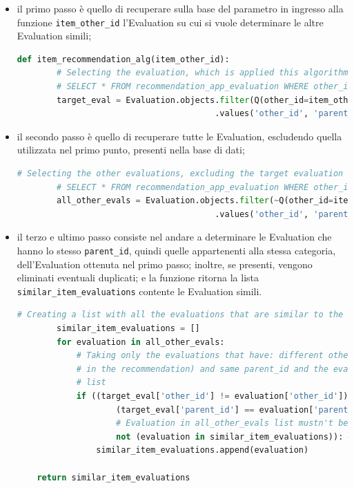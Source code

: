 \begin{itemize}
    \item il primo passo è quello di recuperare sulla base del parametro in ingresso alla funzione \texttt{item\_other\_id} 
    l'Evaluation su cui si vuole determinare le altre Evaluation simili;
    \begin{lstlisting}[language=Python, label=lst:IB_CF_Evaluation_1]
    def item_recommendation_alg(item_other_id):
        # Selecting the evaluation, which is applied this algorithm, from its other_id
        # SELECT * FROM recommendation_app_evaluation WHERE other_id = %(item_other_id)s AND node_type = 'eva'
        target_eval = Evaluation.objects.filter(Q(other_id=item_other_id) & Q(node_type="eva"))\
                                        .values('other_id', 'parent_id')[0]
    \end{lstlisting} 
    \item il secondo passo è quello di recuperare tutte le Evaluation, escludendo quella utilizzata nel primo punto, presenti nella base di dati;
    \begin{lstlisting}[language=Python, label=lst:IB_CF_Evaluation_2]
        # Selecting the other evaluations, excluding the target evaluation
        # SELECT * FROM recommendation_app_evaluation WHERE other_id != %(item_other_id)s AND node_type = 'eva'
        all_other_evals = Evaluation.objects.filter(~Q(other_id=item_other_id) & Q(node_type="eva"))\
                                        .values('other_id', 'parent_id').order_by('other_id')
    \end{lstlisting}
    \item il terzo e ultimo passo consiste nel andare a determinare le Evaluation che hanno lo stesso \texttt{parent\_id}, quindi 
    quelle appartenenti alla stessa categoria, dell'Evaluation ottenuta nel primo passo; inoltre, se presenti, vengono 
    eliminati eventuali duplicati; e la funzione ritorna la lista \texttt{similar\_item\_evaluations} contente le Evaluation simili.
    \begin{lstlisting}[language=Python, label=lst:IB_CF_Evaluation_3]
        # Creating a list with all the evaluations that are similar to the target evaluation (comparing the parent_id)
        similar_item_evaluations = []
        for evaluation in all_other_evals:
            # Taking only the evaluations that have: different other_id (excluding the target evaluation
            # in the recommendation) and same parent_id and the evaluations that weren't added to similar_item_evaluations
            # list
            if ((target_eval['other_id'] != evaluation['other_id']) and  # Evaluations must have different 'other_id'
                    (target_eval['parent_id'] == evaluation['parent_id']) and  # Evaluations must have same 'parent_id'
                    # Evaluation in all_other_evals list mustn't be already added to \
                    not (evaluation in similar_item_evaluations)): # the 'similar_item_evaluations' list
                similar_item_evaluations.append(evaluation)
    
    return similar_item_evaluations 
    \end{lstlisting}
\end{itemize}
